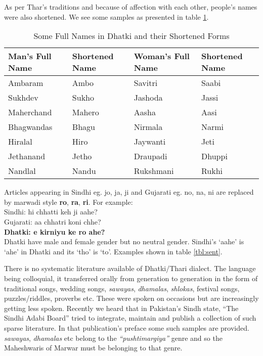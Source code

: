 As per Thar's traditions and because of affection with each other, people's names
were also shortened. We see some samples as presented in table \ref{tbl:names}.
\begin{table}
\begin{center}
\begin{tabular}{l|l|l|l}
\hline
\hline
\textbf{Man's Full Name}  & \textbf{Shortened Name} & \textbf{Woman's Full Name} & \textbf{Shortened Name} \\
\hline
\hline
Ambaram & Ambo & Savitri & Saabi\\
Sukhdev & Sukho & Jashoda & Jassi\\
Maherchand & Mahero & Aasha & Aasi\\
Bhagwandas & Bhagu & Nirmala & Narmi\\
Hiralal & Hiro & Jaywanti & Jeti\\
Jethanand & Jetho & Draupadi & Dhuppi\\
Nandlal & Nandu & Rukshmani & Rukhi\\
\hline
\end{tabular}
\end{center}
\caption{Some Full Names in Dhatki and their Shortened Forms}
\label{tbl:names}
\end{table}
Articles appearing in Sindhi eg. jo, ja, ji and Gujarati eg. no, na, ni are
replaced by marwadi style \textbf{ro}, \textbf{ra}, \textbf{ri}. For example:\\

Sindhi: hi chhatti keh ji aahe?\\
Gujarati: aa chhatri koni chhe?\\
\textbf{Dhatki: e kirniyu ke ro ahe?}\\

Dhatki have male and female gender but no neutral gender. Sindhi's `aahe' is
`ahe' in Dhatki and its `tho' is `to'. Examples shown in table \ref{tbl:sent}.

There is no systematic literature available of Dhatki/Thari dialect. The
language being colloquial, it transferred orally from generation to generation
in the form of traditional songs, wedding songs, \textit{sawayas},
\textit{dhamalas}, \textit{shlokas}, festival songs, puzzles/riddles, proverbs
etc. These were spoken on occasions but are increasingly getting less spoken.
Recently we heard that in Pakistan's Sindh state, ``The Sindhi Adabi Board''
tried to integrate, maintain and publish a collection of such sparse literature.
In that publication's preface some such samples are provided. \textit{sawayas},
\textit{dhamalas} etc belong to the \textit{``pushtimargiya''} genre and so the
Maheshwaris of Marwar must be belonging to that genre.

